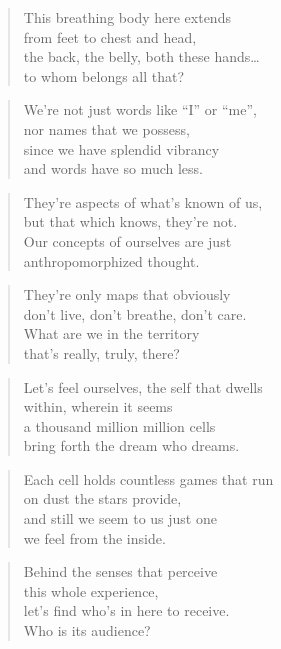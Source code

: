 \documentclass[10pt,a4paper]{article}
\begin{document}
\begin{paracol}{2}
\begin{verse}
This breathing body here extends\\
from feet to chest and head,\\
the back, the belly, both these hands…\\
to whom belongs all that?
\end{verse}

\begin{verse}
We’re not just words like “I” or “me”,\\
nor names that we possess,\\
since we have splendid vibrancy\\
and words have so much less.
\end{verse}

\begin{verse}
They’re aspects of what’s known of us,\\
but that which knows, they’re not.\\
Our concepts of ourselves are just\\
anthropomorphized thought.
\end{verse}

\begin{verse}
They’re only maps that obviously\\
don’t live, don’t breathe, don’t care.\\
What are we in the territory\\
that’s really, truly, there?
\end{verse}

\begin{verse}
Let’s feel ourselves, the self that dwells\\
within, wherein it seems\\
a thousand million million cells\\
bring forth the dream who dreams.
\end{verse}

\begin{verse}
Each cell holds countless games that run\\
on dust the stars provide,\\
and still we seem to us just one\\
we feel from the inside.
\end{verse}

\begin{verse}
Behind the senses that perceive\\
this whole experience,\\
let’s find who’s in here to receive.\\
Who is its audience?
\end{verse}


\end{paracol}
\end{document}
